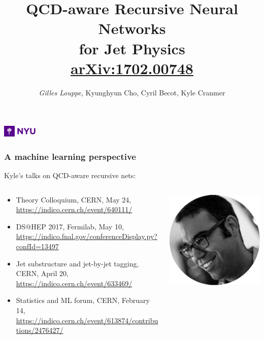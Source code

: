 \documentclass{beamer}
\title{{\bf QCD-aware Recursive Neural Networks \\
for Jet Physics}\\
\href{https://arxiv.org/abs/1702.00748}{arXiv:1702.00748}}
\author{{\it Gilles Louppe}, Kyunghyun Cho, Cyril Becot, Kyle Cranmer}
\date{}
\begin{document}
\begin{frame}[plain]
\titlepage
\centering
\includegraphics[height=1.5em]{figures/nyu.jpg}
\end{frame}




\begin{frame}
    \frametitle{A machine learning perspective}

    Kyle's talks on QCD-aware recursive nets:

    \begin{columns}
        \begin{column}{0.7\textwidth}
            {\footnotesize
            \begin{itemize}
                \item Theory Colloquium, CERN, May 24, \url{https://indico.cern.ch/event/640111/}
                \item DS@HEP 2017, Fermilab, May 10, \url{https://indico.fnal.gov/conferenceDisplay.py?confId=13497}
                \item Jet substructure and jet-by-jet tagging, CERN, April 20, \url{https://indico.cern.ch/event/633469/}
                \item Statistics and ML forum, CERN, February 14, \url{https://indico.cern.ch/event/613874/contributions/2476427/}
            \end{itemize}}
        \end{column}
        \begin{column}{0.25\textwidth}
            \centering
            \includegraphics[width=\textwidth]{figures/kyle.png}
        \end{column}
    \end{columns}


\end{frame}
\end{document}
